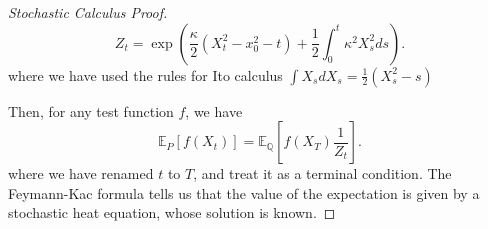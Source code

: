 \begin{itemize}
\begin{proof}[Stochastic Calculus Proof]
			\[
				Z_t = \exp \left( \frac{\kappa}{2}\left( X_t^2 - x_0^2 - t \right) + \frac{1}{2} \int _0^t \kappa^2 X_s^2 ds \right) 
			.\] 
			where we have used the rules for Ito calculus $\int X_s d X_s = \frac{1}{2}(X_s^2 - s)$

			Then, for any test function $f$, we have
			\[
				\mathbb{E}_P \left[ f(X_t) \right] 
				= \mathbb{E}_\mathbb{Q} \left[ f(X_T) \frac{1}{Z_t} \right] 
			.\] 
			where we have renamed $t$ to $T$, and treat it as a terminal condition. The Feymann-Kac formula tells us that the value of the expectation is given by a stochastic heat equation, whose solution is known.
		\end{proof}
		
		
\end{itemize}



